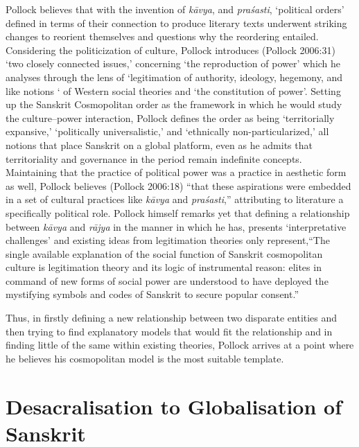 Pollock believes that with the invention of \textit{kāvya}, and \textit{praśasti}, ‘political orders’ defined in terms of their connection to produce literary texts underwent striking changes to reorient themselves and questions why the reordering entailed. Considering the politicization of culture, Pollock introduces (Pollock 2006:31) ‘two closely connected issues,’ concerning ‘the reproduction of power’ which he analyses through the lens of ‘legitimation of authority, ideology, hegemony, and like notions ‘ of Western social theories and ‘the constitution of power’. Setting up the Sanskrit Cosmopolitan order as the framework in which he would study the culture–power interaction, Pollock defines the order as being ‘territorially expansive,’ ‘politically universalistic,’ and ‘ethnically non-particularized,’ all notions that place Sanskrit on a global platform, even as he admits that territoriality and governance in the period remain indefinite concepts. Maintaining that the practice of political power was a practice in aesthetic form as well, Pollock believes (Pollock 2006:18) “that these aspirations were embedded in a set of cultural practices like \textit{kāvya} and \textit{praśasti},” attributing to literature a specifically political role. Pollock himself remarks yet that defining a relationship between \textit{kāvya} and \textit{rājya} in the manner in which he has, presents ‘interpretative challenges’ and existing ideas from legitimation theories only represent,“The single available explanation of the social function of Sanskrit cosmopolitan culture is legitimation theory and its logic of instrumental reason: elites in command of new forms of social power are understood to have deployed the mystifying symbols and codes of Sanskrit to secure popular consent.”

Thus, in firstly defining a new relationship between two disparate entities and then trying to find explanatory models that would fit the relationship and in finding little of the same within existing theories, Pollock arrives at a point where he believes his cosmopolitan model is the most suitable template.


\section{Desacralisation to Globalisation of Sanskrit}

